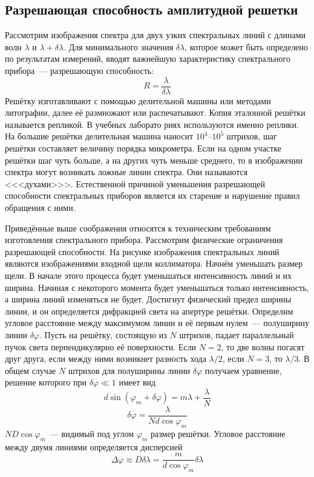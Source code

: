 \subsection{Разрешающая способность амплитудной решетки}
Рассмотрим изображения спектра для двух узких спектральных линий с длинами волн $\lambda$ и $\lambda + \delta\lambda$. Для минимального значения $\delta\lambda$, которое может быть определено по результатам измерений, вводят важнейшую характеристику спектрального прибора~--- разрешающую способность:
\[
R = \frac{\lambda}{\delta\lambda}
\]
Решётку изготавливают с помощью делительной машины или методами литографии, далее её размножают или распечатывают. Копия эталонной решётки называется репликой. В учебных лаборато риях используются именно реплики. На большие решётки делительная машина наносит $10^4$--$10^5$ штрихов, шаг решётки составляет величину порядка микрометра. Если на одном участке решётки шаг чуть больше, а на других чуть меньше среднего, то в изображении спектра могут возникать ложные линии спектра. Они называются <<<духами>>>. Естественной причиной уменьшения разрешающей способности спектральных приборов является их старение и нарушение правил обращения с ними.

\begin{figure}[ht!]
\end{figure}

Приведённые выше соображения относятся к техническим требованиям изготовления спектрального прибора. Рассмотрим физические ограничения разрешающей способности. На рисунке изображения спектральных линий являются изображениями входной щели коллиматора. Начнём уменьшать размер щели. В начале этого процесса будет уменьшаться интенсивность линий и их ширина. Начиная с некоторого момента будет уменьшаться только интенсивность, а ширина линий изменяться не будет. Достигнут физический предел ширины линии, и он определяется дифракцией света на апертуре решётки. Определим угловое расстояние между максимумом линии и её первым нулем~--- полуширину линии $\delta\varphi$. Пусть на решётку, состоящую из $N$ штрихов, падает параллельный пучок света перпендикулярно её поверхности. Если $N=2$, то две волны погасят друг друга, если между ними возникнет разность хода $\lambda / 2$, если $N = 3$, то $\lambda / 3$. В общем случае $N$ штрихов для полуширины линии $\delta\varphi$ получаем уравнение, решение которого при $\delta\varphi \ll 1$ имеет вид
\[
d\sin (\varphi_m + \delta\varphi) = m\lambda + \frac{\lambda}{N}
\]
\[
\delta\varphi = \frac{\lambda}{Nd\cos\varphi_m}
\]
$ND\cos\varphi_m$~--- видимый под углом $\varphi_m$ размер решётки. Угловое расстояние между двумя линиями определяется дисперсией
\[
\Delta\varphi \approx D\delta\lambda = \frac{m}{d\cos\varphi_m}\delta\lambda
\]

